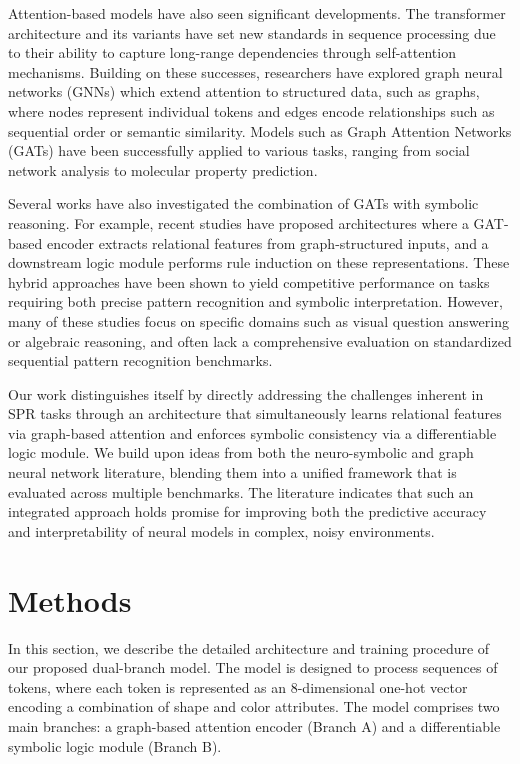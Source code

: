 \documentclass[11pt]{article}
\begin{document}
Attention-based models have also seen significant developments. The transformer architecture and its variants have set new standards in sequence processing due to their ability to capture long-range dependencies through self-attention mechanisms. Building on these successes, researchers have explored graph neural networks (GNNs) which extend attention to structured data, such as graphs, where nodes represent individual tokens and edges encode relationships such as sequential order or semantic similarity. Models such as Graph Attention Networks (GATs) have been successfully applied to various tasks, ranging from social network analysis to molecular property prediction.

Several works have also investigated the combination of GATs with symbolic reasoning. For example, recent studies have proposed architectures where a GAT-based encoder extracts relational features from graph-structured inputs, and a downstream logic module performs rule induction on these representations. These hybrid approaches have been shown to yield competitive performance on tasks requiring both precise pattern recognition and symbolic interpretation. However, many of these studies focus on specific domains such as visual question answering or algebraic reasoning, and often lack a comprehensive evaluation on standardized sequential pattern recognition benchmarks.

Our work distinguishes itself by directly addressing the challenges inherent in SPR tasks through an architecture that simultaneously learns relational features via graph-based attention and enforces symbolic consistency via a differentiable logic module. We build upon ideas from both the neuro-symbolic and graph neural network literature, blending them into a unified framework that is evaluated across multiple benchmarks. The literature indicates that such an integrated approach holds promise for improving both the predictive accuracy and interpretability of neural models in complex, noisy environments.

\section{Methods}
In this section, we describe the detailed architecture and training procedure of our proposed dual-branch model. The model is designed to process sequences of tokens, where each token is represented as an 8-dimensional one-hot vector encoding a combination of shape and color attributes. The model comprises two main branches: a graph-based attention encoder (Branch A) and a differentiable symbolic logic module (Branch B).
\end{document}
